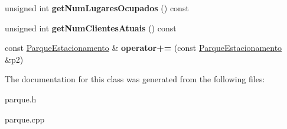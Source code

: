 \begin{DoxyCompactItemize}
\item 
\mbox{\label{classParqueEstacionamento_a3b0f5b5dfc004548e6a627ea098e0679}} 
unsigned int {\bfseries get\+Num\+Lugares\+Ocupados} () const
\item 
\mbox{\label{classParqueEstacionamento_a1c0abb8c0c6921dc93d30527393b4274}} 
unsigned int {\bfseries get\+Num\+Clientes\+Atuais} () const
\item 
\mbox{\label{classParqueEstacionamento_aabc81ce8b17eb653ec4ef4b6dc8d8db1}} 
const \hyperlink{classParqueEstacionamento}{Parque\+Estacionamento} \& {\bfseries operator+=} (const \hyperlink{classParqueEstacionamento}{Parque\+Estacionamento} \&p2)
\end{DoxyCompactItemize}


The documentation for this class was generated from the following files\+:\begin{DoxyCompactItemize}
\item 
parque.\+h\item 
parque.\+cpp\end{DoxyCompactItemize}
